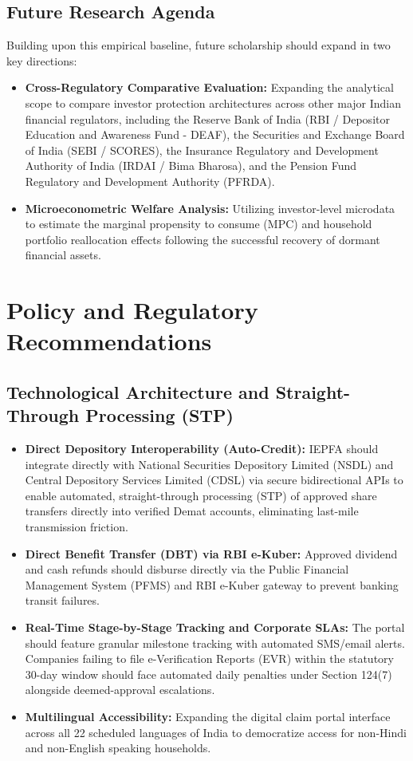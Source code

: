 \documentclass[openany]{book}
\begin{document}
\section{Future Research Agenda}
Building upon this empirical baseline, future scholarship should expand in two key directions:
\begin{itemize}
    \item \textbf{Cross-Regulatory Comparative Evaluation:} Expanding the analytical scope to compare investor protection architectures across other major Indian financial regulators, including the Reserve Bank of India (RBI / Depositor Education and Awareness Fund - DEAF), the Securities and Exchange Board of India (SEBI / SCORES), the Insurance Regulatory and Development Authority of India (IRDAI / Bima Bharosa), and the Pension Fund Regulatory and Development Authority (PFRDA).
    \item \textbf{Microeconometric Welfare Analysis:} Utilizing investor-level microdata to estimate the marginal propensity to consume (MPC) and household portfolio reallocation effects following the successful recovery of dormant financial assets.
\end{itemize}

\chapter{Policy and Regulatory Recommendations}

\section{Technological Architecture and Straight-Through Processing (STP)}
\begin{itemize}
    \item \textbf{Direct Depository Interoperability (Auto-Credit):} IEPFA should integrate directly with National Securities Depository Limited (NSDL) and Central Depository Services Limited (CDSL) via secure bidirectional APIs to enable automated, straight-through processing (STP) of approved share transfers directly into verified Demat accounts, eliminating last-mile transmission friction.
    \item \textbf{Direct Benefit Transfer (DBT) via RBI e-Kuber:} Approved dividend and cash refunds should disburse directly via the Public Financial Management System (PFMS) and RBI e-Kuber gateway to prevent banking transit failures.
    \item \textbf{Real-Time Stage-by-Stage Tracking and Corporate SLAs:} The portal should feature granular milestone tracking with automated SMS/email alerts. Companies failing to file e-Verification Reports (EVR) within the statutory 30-day window should face automated daily penalties under Section 124(7) alongside deemed-approval escalations.
    \item \textbf{Multilingual Accessibility:} Expanding the digital claim portal interface across all 22 scheduled languages of India to democratize access for non-Hindi and non-English speaking households.
\end{itemize}
\end{document}
